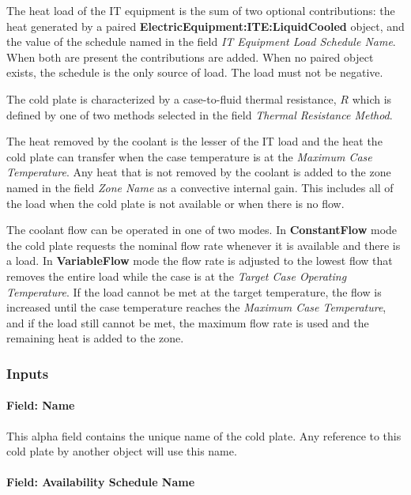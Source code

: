 The heat load of the IT equipment is the sum of two optional contributions: the heat generated by a paired \textbf{ElectricEquipment:ITE:LiquidCooled} object, and the value of the schedule named in the field \emph{IT Equipment Load Schedule Name}. When both are present the contributions are added. When no paired object exists, the schedule is the only source of load. The load must not be negative.

The cold plate is characterized by a case-to-fluid thermal resistance, \(R\) which is defined by one of two methods selected in the field \emph{Thermal Resistance Method}.

The heat removed by the coolant is the lesser of the IT load and the heat the cold plate can transfer when the case temperature is at the \emph{Maximum Case Temperature}. Any heat that is not removed by the coolant is added to the zone named in the field \emph{Zone Name} as a convective internal gain. This includes all of the load when the cold plate is not available or when there is no flow.

The coolant flow can be operated in one of two modes. In \textbf{ConstantFlow} mode the cold plate requests the nominal flow rate whenever it is available and there is a load. In \textbf{VariableFlow} mode the flow rate is adjusted to the lowest flow that removes the entire load while the case is at the \emph{Target Case Operating Temperature}. If the load cannot be met at the target temperature, the flow is increased until the case temperature reaches the \emph{Maximum Case Temperature}, and if the load still cannot be met, the maximum flow rate is used and the remaining heat is added to the zone.

\subsubsection{Inputs}\label{inputs-coilcoolingitecoldplate}

\paragraph{Field: Name}\label{field-name-coilcoolingitecoldplate}

This alpha field contains the unique name of the cold plate. Any reference to this cold plate by another object will use this name.

\paragraph{Field: Availability Schedule Name}\label{field-availability-schedule-name-coilcoolingitecoldplate}

